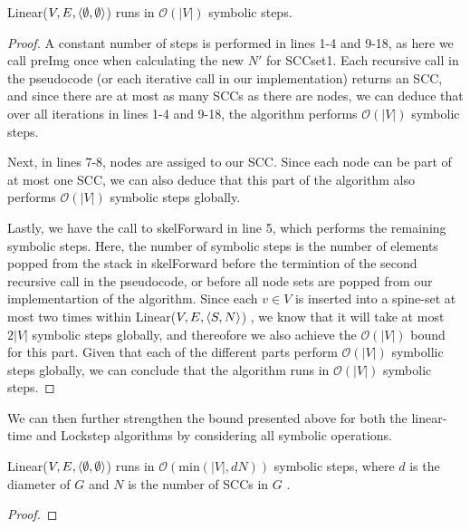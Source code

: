 \documentclass[../master/master.tex]{subfiles}
\begin{document}
\begin{theorem}\label{linear} Linear($V, E, \langle \emptyset, \emptyset\rangle$) runs in $\mathcal{O}(|V|)$ symbolic steps.
\end{theorem}
\begin{proof} A constant number of steps is performed in lines 1-4 and 9-18, as here we call preImg once when calculating the new $N'$ for SCCset1. Each recursive call in the pseudocode (or each iterative call in our implementation) returns an SCC, and since there are at most as many SCCs as there are nodes, we can deduce that over all iterations in lines 1-4 and 9-18, the algorithm performs $\mathcal{O}(|V|)$ symbolic steps.

Next, in lines 7-8, nodes are assiged to our SCC. Since each node can be part of at most one SCC, we can also deduce that this part of the algorithm also performs $\mathcal{O}(|V|)$ symbolic steps globally.

Lastly, we have the call to skelForward in line 5, which performs the remaining symbolic steps. Here, the number of symbolic steps is the number of elements popped from the stack in skelForward before the termintion of the second recursive call in the pseudocode, or before all node sets are popped from our implementartion of the algorithm. Since each $v\in V$ is inserted into a spine-set at most two times within Linear($V, E, \langle S, N\rangle$) \cite[p.~137-138]{linear}, we know that it will take at most $2|V|$ symbolic steps globally, and thereofore we also achieve the $\mathcal{O}(|V|)$ bound for this part.
Given that each of the different parts perform $\mathcal{O}(|V|)$ symbollic steps globally, we can conclude that the algorithm runs in $\mathcal{O}(|V|)$ symbolic steps.
\end{proof}
We can then further strengthen the bound presented above for both the linear-time and Lockstep algorithms by considering all symbolic operations.
\begin{theorem}\label{linear-strengthened} Linear($V, E, \langle \emptyset, \emptyset\rangle$) runs in $\mathcal{O}(\text{min}(|V|, dN))$ symbolic steps, where $d$ is the diameter of $G$ and $N$ is the number of SCCs in $G$ .\end{theorem}
\begin{proof}
\end{proof}
\end{document}
